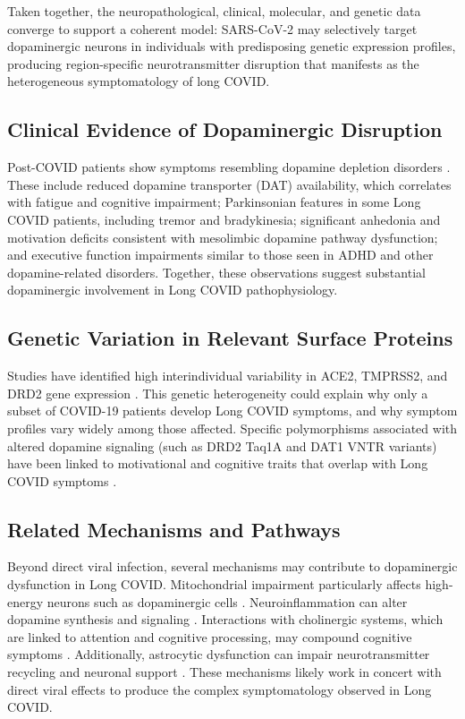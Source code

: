 \documentclass[11pt]{article}
\begin{document}
Taken together, the neuropathological, clinical, molecular, and genetic data converge to support a coherent model: SARS-CoV-2 may selectively target dopaminergic neurons in individuals with predisposing genetic expression profiles, producing region-specific neurotransmitter disruption that manifests as the heterogeneous symptomatology of long COVID.


\subsection*{Clinical Evidence of Dopaminergic Disruption}
Post-COVID patients show symptoms resembling dopamine depletion disorders \citep{brundin2020parkinsonmanagement, devine2022parkinsonscovid}. These include reduced dopamine transporter (DAT) availability, which correlates with fatigue and cognitive impairment; Parkinsonian features in some Long COVID patients, including tremor and bradykinesia; significant anhedonia and motivation deficits consistent with mesolimbic dopamine pathway dysfunction; and executive function impairments similar to those seen in ADHD and other dopamine-related disorders. Together, these observations suggest substantial dopaminergic involvement in Long COVID pathophysiology.

\subsection*{Genetic Variation in Relevant Surface Proteins}
Studies have identified high interindividual variability in ACE2, TMPRSS2, and DRD2 gene expression \citep{cao2020ace2genetics, hou2021ace2variants, eisenstein2016drd2}. This genetic heterogeneity could explain why only a subset of COVID-19 patients develop Long COVID symptoms, and why symptom profiles vary widely among those affected. Specific polymorphisms associated with altered dopamine signaling (such as DRD2 Taq1A and DAT1 VNTR variants) have been linked to motivational and cognitive traits that overlap with Long COVID symptoms \citep{gizer2009adhdgenes}.

\subsection*{Related Mechanisms and Pathways}
Beyond direct viral infection, several mechanisms may contribute to dopaminergic dysfunction in Long COVID. Mitochondrial impairment particularly affects high-energy neurons such as dopaminergic cells \citep{stefano2021mitochondrialfog}. Neuroinflammation can alter dopamine synthesis and signaling \citep{crunfli2023astrocytes}. Interactions with cholinergic systems, which are linked to attention and cognitive processing, may compound cognitive symptoms \citep{leitzke2025cholinergic}. Additionally, astrocytic dysfunction can impair neurotransmitter recycling and neuronal support \citep{crunfli2023astrocytes}. These mechanisms likely work in concert with direct viral effects to produce the complex symptomatology observed in Long COVID.
\end{document}
